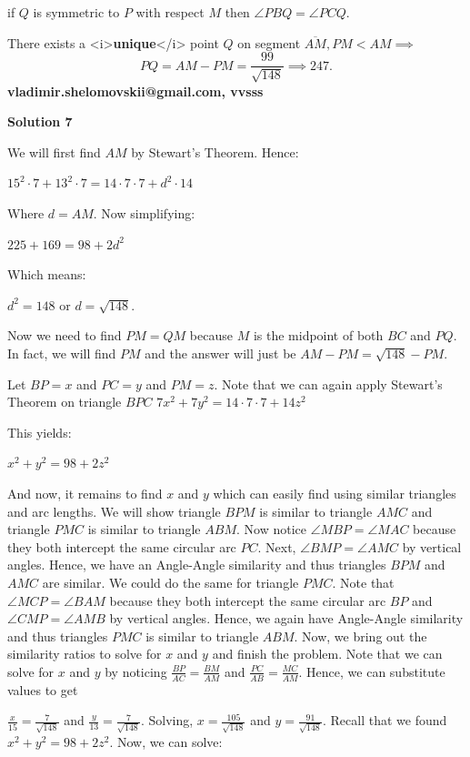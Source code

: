 \begin{enumerate}
 if $Q$ is symmetric to $P$ with respect $M$ then $\angle PBQ = \angle PCQ.$

 There exists a <i>\textbf{unique}</i> point $Q$ on segment $\overline{AM}, PM < AM \implies$
 \[PQ = AM - PM = \frac{99}{\sqrt{148}} \implies \boxed{247}.\]\textbf{vladimir.shelomovskii@gmail.com, vvsss}

 



\textbf{Solution 7}

We will first find $AM$ by Stewart's Theorem. Hence:

 $15^{2} \cdot 7 + 13^{2} \cdot 7 = 14 \cdot 7 \cdot 7 + d^{2} \cdot 14$

 Where $d = AM$. Now simplifying:

 $225 + 169 = 98 + 2d^{2}$

 Which means:

 $d^{2} = 148$ or $d = \sqrt{148}$.

 Now we need to find $PM = QM$ because $M$ is the midpoint of both $BC$ and $PQ$. In fact, we will find $PM$ and the answer will just be $AM - PM = \sqrt{148} - PM$. 

 Let $BP = x$ and $PC = y$ and $PM = z$. Note that we can again apply Stewart's Theorem on triangle $BPC$
$7x^{2} + 7y^{2} = 14 \cdot 7 \cdot 7 + 14z^{2}$

 This yields:

 $x^{2} + y^{2} = 98 + 2z^{2}$

 And now, it remains to find $x$ and $y$ which can easily find using similar triangles and arc lengths. We will show triangle $BPM$ is similar to triangle $AMC$ and triangle $PMC$ is similar to triangle $ABM$. Now notice $\angle MBP = \angle MAC$ because they both intercept the same circular arc $PC$. Next, $\angle BMP = \angle AMC$ by vertical angles. Hence, we have an Angle-Angle similarity and thus triangles $BPM$ and $AMC$ are similar. We could do the same for triangle $PMC$. Note that $\angle MCP = \angle BAM$ because they both intercept the same circular arc $BP$ and $\angle CMP = \angle AMB$ by vertical angles. Hence, we again have Angle-Angle similarity and thus triangles $PMC$ is similar to triangle $ABM$. Now, we bring out the similarity ratios to solve for $x$ and $y$ and finish the problem. Note that we can solve for $x$ and $y$ by noticing $\frac{BP}{AC} = \frac{BM}{AM}$ and $\frac{PC}{AB} = \frac{MC}{AM}$. Hence, we can substitute values to get

 $\frac{x}{15} = \frac{7}{\sqrt{148}}$ and $\frac{y}{13} = \frac{7}{\sqrt{148}}$. Solving, $x = \frac{105}{\sqrt{148}}$ and $y = \frac{91}{\sqrt{148}}$. Recall that we found $x^{2} + y^{2} = 98 + 2z^{2}$. Now, we can solve:


\end{enumerate}
